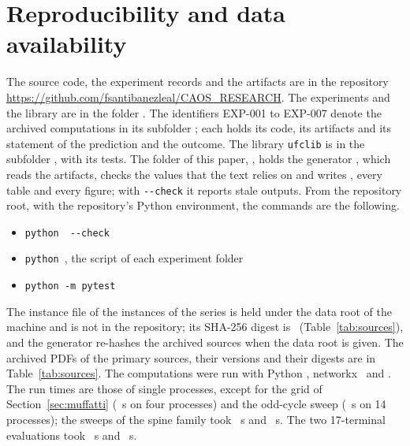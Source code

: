 \documentclass[11pt]{article}
\theoremstyle{remark}
\newcommand{\EXP}[1]{\mbox{EXP-#1}}
\begin{document}
\section{Reproducibility and data availability}
\label{sec:repro}

The source code, the experiment records and the artifacts are in the repository \url{https://github.com/fsantibanezleal/CAOS_RESEARCH}. The experiments and the library are in the folder . The identifiers \EXP{001} to \EXP{007} denote the archived computations in its subfolder ; each holds its code, its artifacts and its statement of the prediction and the outcome. The library \texttt{ufclib} is in the subfolder , with its tests. The folder of this paper, ,
holds the generator , which reads the artifacts, checks the values that the text relies on and writes , every table and every figure; with \texttt{-{}-check} it reports stale outputs. From the repository root, with the repository's Python environment, the commands are the following.
\begin{itemize}\setlength{\itemsep}{1pt}\raggedright
\item \texttt{python}\ \ \texttt{-{}-check}
\item \texttt{python}\ , the script of each experiment folder
\item \texttt{python -m pytest}\ 
\end{itemize}

The instance file of the instances of the series is held under the data root of the machine and is not in the repository; its SHA-256 digest is \ninstdigest\ (Table~\ref{tab:sources}), and the generator re-hashes the archived sources when the data root is given. The archived PDFs of the primary sources, their versions and their digests are in Table~\ref{tab:sources}.
The computations were run with Python \npython, networkx \nnetworkx\ and \nplatform. The run times are those of single processes, except for the grid of Section~\ref{sec:muffatti} (\ngridwall\ s on four processes) and the odd-cycle sweep (\nsixwall\ s on 14 processes); the sweeps of the spine family took \nfamthreesec\ s and \nfamfoursec\ s. The two 17-terminal evaluations took \nkrecsec\ s and \nkrefsec\ s.
\end{document}
